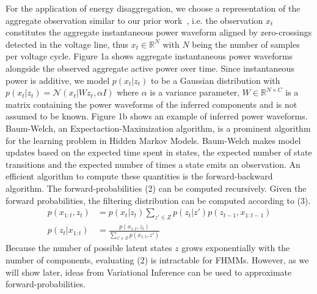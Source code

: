 For the application of energy disaggregation, we choose a representation of the aggregate observation similar to our prior work~\cite{lange2016bolt}, i.e. the observation $x_t$ constitutes the aggregate instantaneous power waveform aligned by zero-crossings detected in the voltage line, thus $x_t \in \mathbb{R}^N$ with $N$ being the number of samples per voltage cycle. Figure 1a shows aggregate instantaneous power waveforms alongside the observed aggregate active power over time. Since instantaneous power is additive, we model $p(x_t|z_t)$ to be a Gaussian distribution with $p(x_t|z_t) = \mathcal{N}(x_t | Wz_t, \alpha I)$ where $\alpha$ is a variance parameter, $W \in \mathbb{R}^{N \times C}$ is a matrix containing the power waveforms of the inferred components and is not assumed to be known. Figure 1b shows an example of inferred power waveforms.\\
Baum-Welch, an Expectaction-Maximization algorithm, is a prominent algorithm for the learning problem in Hidden Markov Models. Baum-Welch makes model updates based on the expected time spent in states, the expected number of state transitions and the expected number of times a state emits an observation. An efficient algorithm to compute these quantities is the forward-backward algorithm. The forward-probabilities (2) can be computed recursively. Given the forward probabilities, the filtering distribution can be computed according to (3).
\begin{align}
p(x_{1:t},z_t) &= p(x_t|z_t) \sum_{z' \in Z} p(z_t|z') p(z_{t-1}, x_{1:t-1})\\
p(z_t|x_{1:t}) &= \frac{p(x_{1:t},z_t)}{\sum_{z' \in Z} p(x_{1:t},z')}
\end{align}
Because the number of possible latent states $z$ grows exponentially with the number of components, evaluating (2) is intractable for FHMMs. However, as we will show later, ideas from Variational Inference can be used to approximate forward-probabilities.\\
